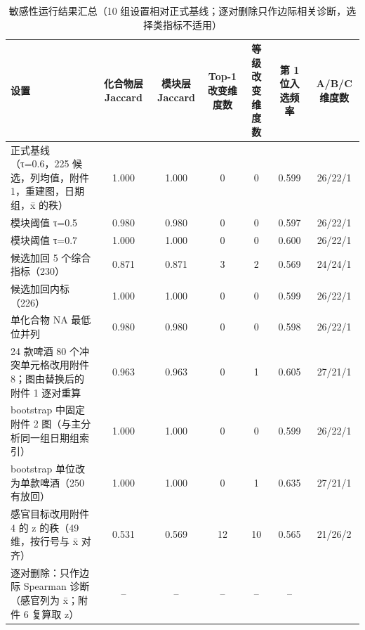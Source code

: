 \begin{table}[htbp]
\centering
\caption{敏感性运行结果汇总（10 组设置相对正式基线；逐对删除只作边际相关诊断，选择类指标不适用）}\label{tab:q2_sensitivity}
\begin{tabular}{p{6.2cm}cccccc}
\toprule
设置 & 化合物层 Jaccard & 模块层 Jaccard & Top-1 改变维度数 & 等级改变维度数 & 第 1 位入选频率 & A/B/C 维度数 \\
\midrule
正式基线（τ=0.6，225 候选，列均值，附件 1，重建图，日期组，x̄ 的秩） & 1.000 & 1.000 & 0 & 0 & 0.599 & 26/22/1 \\
模块阈值 τ=0.5 & 0.980 & 0.980 & 0 & 0 & 0.597 & 26/22/1 \\
模块阈值 τ=0.7 & 1.000 & 1.000 & 0 & 0 & 0.600 & 26/22/1 \\
候选加回 5 个综合指标（230） & 0.871 & 0.871 & 3 & 2 & 0.569 & 24/24/1 \\
候选加回内标（226） & 1.000 & 1.000 & 0 & 0 & 0.599 & 26/22/1 \\
单化合物 NA 最低位并列 & 0.980 & 0.980 & 0 & 0 & 0.598 & 26/22/1 \\
24 款啤酒 80 个冲突单元格改用附件 8；图由替换后的附件 1 逐对重算 & 0.963 & 0.963 & 0 & 1 & 0.605 & 27/21/1 \\
bootstrap 中固定附件 2 图（与主分析同一组日期组索引） & 1.000 & 1.000 & 0 & 0 & 0.599 & 26/22/1 \\
bootstrap 单位改为单款啤酒（250 有放回） & 1.000 & 1.000 & 0 & 1 & 0.635 & 27/21/1 \\
感官目标改用附件 4 的 z 的秩（49 维，按行号与 x̄ 对齐） & 0.531 & 0.569 & 12 & 10 & 0.565 & 21/26/2 \\
逐对删除：只作边际 Spearman 诊断（感官列为 x̄；附件 6 复算取 z） & -- & -- & -- & -- & -- &  \\
\bottomrule
\end{tabular}
\end{table}

